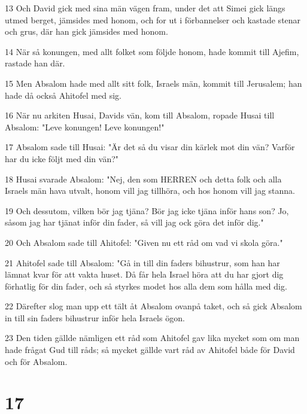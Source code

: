 \par 13 Och David gick med sina män vägen fram, under det att Simei gick längs utmed berget, jämsides med honom, och for ut i förbannelser och kastade stenar och grus, där han gick jämsides med honom.
\par 14 När så konungen, med allt folket som följde honom, hade kommit till Ajefim, rastade han där.
\par 15 Men Absalom hade med allt sitt folk, Israels män, kommit till Jerusalem; han hade då också Ahitofel med sig.
\par 16 När nu arkiten Husai, Davids vän, kom till Absalom, ropade Husai till Absalom: "Leve konungen! Leve konungen!"
\par 17 Absalom sade till Husai: "Är det så du visar din kärlek mot din vän? Varför har du icke följt med din vän?"
\par 18 Husai svarade Absalom: "Nej, den som HERREN och detta folk och alla Israels män hava utvalt, honom vill jag tillhöra, och hos honom vill jag stanna.
\par 19 Och dessutom, vilken bör jag tjäna? Bör jag icke tjäna inför hans son? Jo, såsom jag har tjänat inför din fader, så vill jag ock göra det inför dig."
\par 20 Och Absalom sade till Ahitofel: "Given nu ett råd om vad vi skola göra."
\par 21 Ahitofel sade till Absalom: "Gå in till din faders bihustrur, som han har lämnat kvar för att vakta huset. Då får hela Israel höra att du har gjort dig förhatlig för din fader, och så styrkes modet hos alla dem som hålla med dig.
\par 22 Därefter slog man upp ett tält åt Absalom ovanpå taket, och så gick Absalom in till sin faders bihustrur inför hela Israels ögon.
\par 23 Den tiden gällde nämligen ett råd som Ahitofel gav lika mycket som om man hade frågat Gud till råds; så mycket gällde vart råd av Ahitofel både för David och för Absalom.

\chapter{17}

